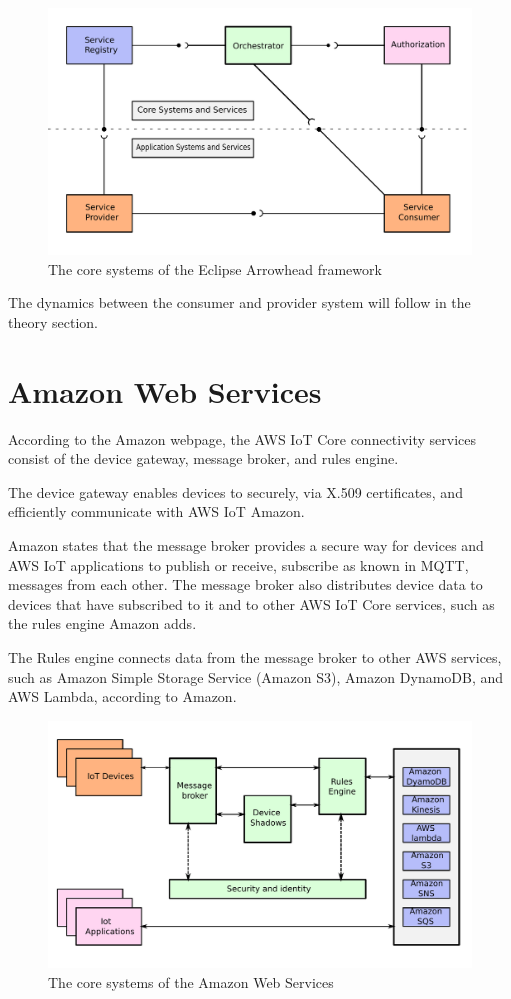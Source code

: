\begin{figure}[H]
    \centering
    \includegraphics[width=\textwidth]{Pictures/ah.pdf} 
    \caption{The core systems of the Eclipse Arrowhead framework}
    \label{diagram arrowhead}
\end{figure}
The dynamics between the consumer and provider system will follow in the theory section.
\section{Amazon Web Services}
According to the Amazon webpage, the AWS IoT Core connectivity services consist of the device gateway, message broker, and rules engine.

The device gateway enables devices to securely, via X.509 certificates, and efficiently communicate with AWS IoT Amazon.

Amazon states that the message broker provides a secure way for devices and AWS IoT applications to publish or receive, subscribe as known in MQTT, messages from each other.
The message broker also distributes device data to devices that have subscribed to it and to other AWS IoT Core services, such as the rules engine Amazon adds. 

The Rules engine connects data from the message broker to other AWS services, such as Amazon Simple Storage Service (Amazon S3), Amazon DynamoDB, and AWS Lambda, according to Amazon.\cite{AWS2021}

\begin{figure}[H]
    \centering
    \includegraphics[width=\textwidth]{Pictures/aws.pdf} 
    \caption{The core systems of the Amazon Web Services}
    \label{diagram AWS}
\end{figure}

